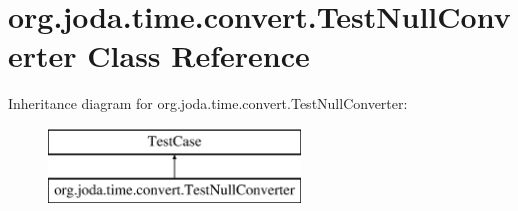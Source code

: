 \hypertarget{classorg_1_1joda_1_1time_1_1convert_1_1_test_null_converter}{\section{org.\-joda.\-time.\-convert.\-Test\-Null\-Converter Class Reference}
\label{classorg_1_1joda_1_1time_1_1convert_1_1_test_null_converter}
}
Inheritance diagram for org.\-joda.\-time.\-convert.\-Test\-Null\-Converter\-:\begin{figure}[H]
\begin{center}
\leavevmode
\includegraphics[height=2.000000cm]{classorg_1_1joda_1_1time_1_1convert_1_1_test_null_converter}
\end{center}
\end{figure}

